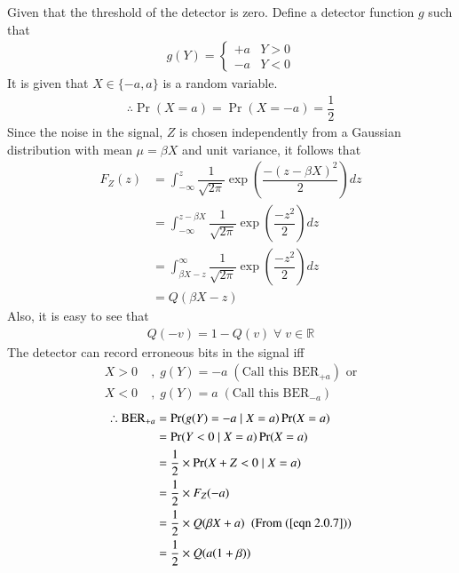 
Given that the threshold of the detector is zero. Define a detector function $g$ such that
\begin{align}
g(Y) = 
\begin{cases}
+a & Y>0 \\
-a & Y<0
\end{cases}
\end{align}
It is given that $X \in \{ -a, a\}$ is a random variable.
\begin{align}
\therefore \Pr(X=a) = \Pr(X=-a) = \dfrac{1}{2}
\end{align}
Since the noise in the signal, $Z$ is chosen independently from a Gaussian distribution with mean $ \mu = \beta X$ and unit variance, it follows that
\begin{align}
F_Z(z) &= \int_{-\infty}^{z} \dfrac{1}{\sqrt{2\pi}} \exp \left( \dfrac{-(z - \beta X)^2}{2} \right) dz \\
&= \int_{-\infty}^{z - \beta X} \dfrac{1}{\sqrt{2\pi}} \exp \left( \dfrac{-z^2}{2} \right) dz \\
&= \int_{\beta X-z}^{\infty} \dfrac{1}{\sqrt{2\pi}} \exp \left( \dfrac{-z^2}{2} \right) dz \\
&= Q(\beta X - z) \label{eqn 2.0.7}
\end{align}
Also, it is easy to see that 
\begin{align}
Q(-v) = 1 - Q(v) \; \forall \; v \in \mathbb{R} \label{eqn 2.0.8}
\end{align}
The detector can record erroneous bits in the signal iff
\begin{align}
X>0 \; &, \; g(Y) = -a \; (\text{Call this BER}_{+a}) \text{ or}\\
X<0 \; &, \; g(Y) = a \; (\text{Call this BER}_{-a})
\end{align}
\begin{align}
\therefore \text{BER}_{+a} %
&= \Pr(g(Y) = -a \;|\; X = a) \Pr(X=a)\\
&= \Pr(Y < 0 \;|\; X = a) \Pr(X=a)\\
&= \dfrac{1}{2} \times \Pr(X+Z < 0 \;|\; X = a) \\
&= \dfrac{1}{2} \times F_Z(-a)\\
&= \dfrac{1}{2} \times Q(\beta X + a) \; \text{ (From (\ref{eqn 2.0.7}))}\\
&= \dfrac{1}{2} \times Q(a(1+\beta))
\end{align}
